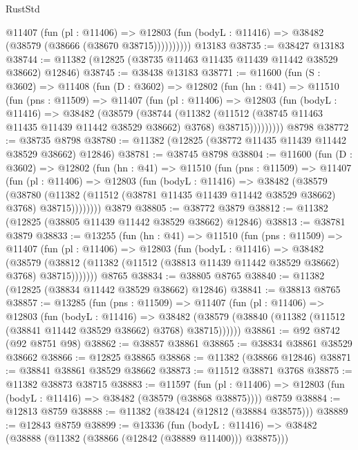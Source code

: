 \begin{lexlean}{RustStd}
\begin{coremodule}
            @11407
              (fun (pl : @11406) =>
              @12803 (fun (bodyL : @11416) => @38482 (@38579 (@38666 (@38670 @38715))))))))))
    @13183
@38735 := @38427 @13183
@38744 := @11382 (@12825 (@38735 @11463 @11435 @11439 @11442 @38529 @38662) @12846)
@38745 := @38438 @13183
@38771 := @11600
    (fun (S : @3602) =>
    @11408
      (fun (D : @3602) =>
      @12802
        (fun (hn : @41) =>
        @11510
          (fun (pns : @11509) =>
          @11407
            (fun (pl : @11406) =>
            @12803
              (fun (bodyL : @11416) =>
              @38482
                (@38579
                  (@38744
                    (@11382
                      (@11512 (@38745 @11463 @11435 @11439 @11442 @38529 @38662) @3768)
                      @38715)))))))))
    @8798
@38772 := @38735 @8798
@38780 := @11382 (@12825 (@38772 @11435 @11439 @11442 @38529 @38662) @12846)
@38781 := @38745 @8798
@38804 := @11600
    (fun (D : @3602) =>
    @12802
      (fun (hn : @41) =>
      @11510
        (fun (pns : @11509) =>
        @11407
          (fun (pl : @11406) =>
          @12803
            (fun (bodyL : @11416) =>
            @38482
              (@38579
                (@38780
                  (@11382 (@11512 (@38781 @11435 @11439 @11442 @38529 @38662) @3768) @38715))))))))
    @3879
@38805 := @38772 @3879
@38812 := @11382 (@12825 (@38805 @11439 @11442 @38529 @38662) @12846)
@38813 := @38781 @3879
@38833 := @13255
    (fun (hn : @41) =>
    @11510
      (fun (pns : @11509) =>
      @11407
        (fun (pl : @11406) =>
        @12803
          (fun (bodyL : @11416) =>
          @38482
            (@38579
              (@38812 (@11382 (@11512 (@38813 @11439 @11442 @38529 @38662) @3768) @38715)))))))
    @8765
@38834 := @38805 @8765
@38840 := @11382 (@12825 (@38834 @11442 @38529 @38662) @12846)
@38841 := @38813 @8765
@38857 := @13285
    (fun (pns : @11509) =>
    @11407
      (fun (pl : @11406) =>
      @12803
        (fun (bodyL : @11416) =>
        @38482 (@38579 (@38840 (@11382 (@11512 (@38841 @11442 @38529 @38662) @3768) @38715))))))
@38861 := @92 @8742 (@92 @8751 @98)
@38862 := @38857 @38861
@38865 := @38834 @38861 @38529 @38662
@38866 := @12825 @38865
@38868 := @11382 (@38866 @12846)
@38871 := @38841 @38861 @38529 @38662
@38873 := @11512 @38871 @3768
@38875 := @11382 @38873 @38715
@38883 := @11597
    (fun (pl : @11406) => @12803 (fun (bodyL : @11416) => @38482 (@38579 (@38868 @38875))))
    @8759
@38884 := @12813 @8759
@38888 := @11382 (@38424 (@12812 (@38884 @38575)))
@38889 := @12843 @8759
@38899 := @13336
    (fun (bodyL : @11416) => @38482 (@38888 (@11382 (@38866 (@12842 (@38889 @11400))) @38875)))

\end{coremodule}
\end{lexlean}
